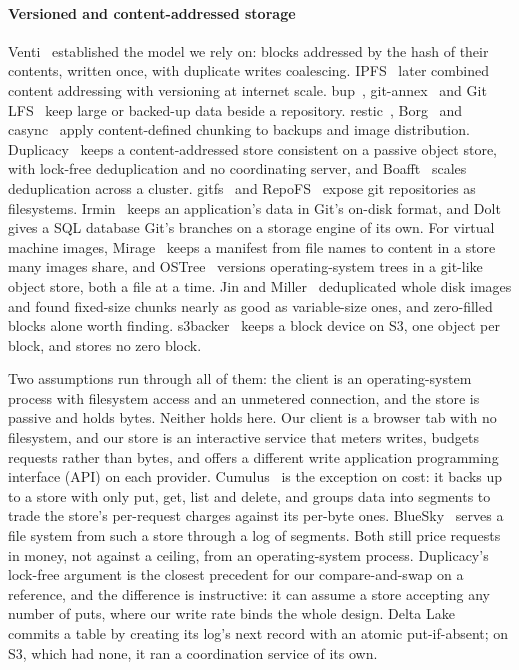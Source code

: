 \documentclass[journal,10pt]{IEEEtran}
\begin{document}
\paragraph{Versioned and content-addressed storage}
Venti~\cite{venti} established the model we rely on: blocks addressed by the
hash of their contents, written once, with duplicate writes coalescing.
IPFS~\cite{ipfs} later combined content addressing with versioning at internet
scale. bup~\cite{bup}, git-annex~\cite{gitannex} and Git LFS~\cite{gitlfs} keep
large or backed-up data beside a repository. restic~\cite{restic},
Borg~\cite{borg} and casync~\cite{casync} apply content-defined chunking to
backups and image distribution. Duplicacy~\cite{duplicacy} keeps a
content-addressed store consistent on a passive object store, with lock-free
deduplication and no coordinating server, and Boafft~\cite{boafft} scales
deduplication across a cluster. gitfs~\cite{gitfs} and RepoFS~\cite{repofs}
expose git repositories as filesystems. Irmin~\cite{irmin} keeps an
application's data in Git's on-disk format, and Dolt~\cite{dolt} gives a SQL
database Git's branches on a storage engine of its own. For virtual machine images,
Mirage~\cite{mirage} keeps a manifest from file names to content in a store many
images share, and OSTree~\cite{ostree} versions operating-system trees in a
git-like object store, both a file at a time. Jin and Miller~\cite{jinmiller}
deduplicated whole disk images and found fixed-size chunks nearly as good as
variable-size ones, and zero-filled blocks alone worth finding. s3backer~\cite{s3backer}
keeps a block device on S3, one object per block, and stores no zero block.

Two assumptions run through all of them: the client is an operating-system
process with filesystem access and an unmetered connection, and the store is
passive and holds bytes. Neither holds here. Our client is a browser tab with no
filesystem, and our store is an interactive service that meters writes, budgets
requests rather than bytes, and offers a different write application
programming interface (API) on each provider.
Cumulus~\cite{cumulus} is the exception on cost: it backs up to a store with
only put, get, list and delete, and groups data into segments to trade the
store's per-request charges against its per-byte ones. BlueSky~\cite{bluesky}
serves a file system from such a store through a log of segments. Both still
price requests in money, not against a ceiling, from an operating-system
process. Duplicacy's lock-free argument is the closest precedent for our compare-and-swap
on a reference, and the difference is instructive: it can assume a store
accepting any number of puts, where our write rate binds the whole design.
Delta Lake~\cite{deltalake} commits a table by creating its log's next record
with an atomic put-if-absent; on S3, which had none, it ran a coordination
service of its own.
\end{document}
